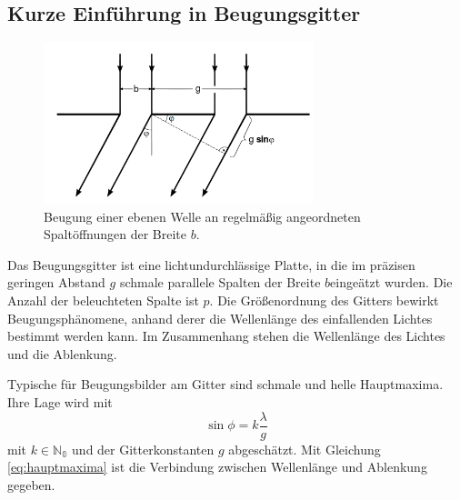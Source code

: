 \subsection{Kurze Einführung in Beugungsgitter}
\begin{figure}
	\centering
	\includegraphics[width=0.7\textwidth]{Bilder/Gitter.png}
	\caption{Beugung einer ebenen Welle an regelmäßig angeordneten Spaltöffnungen der Breite $b$. \cite{skript}} 
\end{figure}
Das Beugungsgitter ist eine lichtundurchlässige Platte, in die im präzisen geringen Abstand $g$ schmale parallele Spalten der Breite $b$eingeätzt wurden.
Die Anzahl der beleuchteten Spalte ist $p$.
Die Größenordnung des Gitters bewirkt Beugungsphänomene, anhand derer die Wellenlänge des einfallenden Lichtes bestimmt werden kann.
Im Zusammenhang stehen die Wellenlänge des Lichtes und die Ablenkung.


%
Typische für Beugungsbilder am Gitter sind schmale und helle Hauptmaxima.
Ihre Lage wird mit 
\begin{equation}
	\sin{\phi}= k\frac{\lambda}{g} 
	\label{eq:hauptmaxima}
\end{equation}
mit $k\in\mathbb{N_0}$ und der Gitterkonstanten $g$ abgeschätzt.
Mit Gleichung \eqref{eq:hauptmaxima} ist die Verbindung zwischen Wellenlänge und Ablenkung gegeben.

